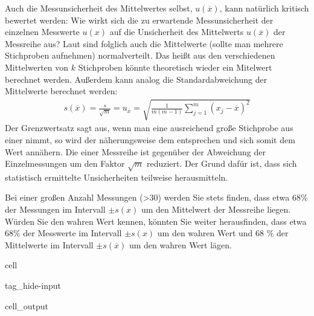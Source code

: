 \documentclass[letterpaper,10pt,english]{jupyterBook}
\begin{document}
\sphinxAtStartPar
Auch die Messunsicherheit des Mittelwertes selbst, \(u(\overline x)\), kann natürlich kritisch bewertet werden: Wie wirkt sich die zu erwartende Messunsicherheit der einzelnen Messwerte \(u(x)\) auf die Unsicherheit des Mittelwerts \(u(\overline x)\) der Messreihe aus?
Laut  sind folglich auch die Mittelwerte (sollte man mehrere Stichproben aufnehmen) normalverteilt. Das heißt aus den verschiedenen Mittelwerten von \(k\) Stichproben könnte theoretisch wieder ein Mitelwert berechnet werden. Außerdem kann analog die Standardabweichung der Mittelwerte berechnet werden:
\begin{equation*}
\begin{split}s(\overline x) = \frac{s}{\sqrt{m}} = u_{\overline x}  = \sqrt{\frac{1}{m(m-1)} \sum_{j=1}^m (x_j - \overline x)^2}\end{split}
\end{equation*}
\sphinxAtStartPar
Der Grenzwertsatz sagt aus, wenn man eine ausreichend große Stichprobe aus einer  nimmt, so wird der  näherungsweise dem  entsprechen und sich somit dem  Wert annähern.  Die  einer Messreihe ist gegenüber der Abweichung der Einzelmessungen um den Faktor \(\sqrt{m}\) reduziert. Der Grund dafür ist, dass sich statistisch ermittelte Unsicherheiten teilweise herausmitteln.

\sphinxAtStartPar
Bei einer großen Anzahl Messungen (>30) werden Sie stets finden, dass etwa 68\% der Messungen im Intervall \(\pm s(x)\) um den Mittelwert der Messreihe liegen. Würden Sie den wahren Wert kennen, könnten Sie weiter herausfinden, dass etwa 68\% der Messwerte im Intervall \(\pm s(x)\) um den wahren Wert und 68 \% der Mittelwerte im Intervall \(\pm s(\overline x)\) um den wahren Wert lägen.

\begin{sphinxuseclass}{cell}
\begin{sphinxuseclass}{tag_hide-input}\begin{sphinxVerbatimOutput}

\begin{sphinxuseclass}{cell_output}
\noindent{}

\end{sphinxuseclass}\end{sphinxVerbatimOutput}

\end{sphinxuseclass}
\end{sphinxuseclass}
\end{document}
